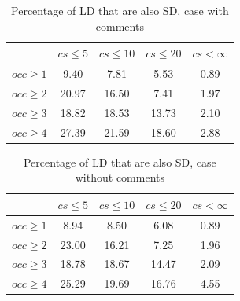 \documentclass[conference]{IEEEtran}
\begin{document}
\begin{table}[!h]
\renewcommand{\arraystretch}{1.25}
\caption{Percentage of LD that are also SD, case with comments}
\label{tab:percLD:comm}
\centering

\begin{tabular}{|c|c|c|c|c|}
\hline
	      &	$cs\leq 5$	&	$cs\leq 10$	&	$cs\leq 20$	&	$cs< \infty$	\\
\hline
$occ\geq 1$	&	9.40	&	7.81	&	5.53	&	0.89	\\
$occ\geq 2$	&	20.97	&	16.50	&	7.41	&	1.97	\\
$occ\geq 3$&	18.82	&	18.53	&	13.73	&	2.10	\\
$occ\geq 4$&	27.39	&	21.59	&	18.60	&	2.88	\\

\hline
\end{tabular}
\end{table}


\begin{table}[!h]
\renewcommand{\arraystretch}{1.25}
\caption{Percentage of LD that are also SD, case without comments}
\label{tab:percLD:nocomm}
\centering
\begin{tabular}{|c|c|c|c|c|}
\hline
	      &	$cs\leq 5$	&	$cs\leq 10$	&	$cs\leq 20$	&	$cs< \infty$	\\
\hline
$occ\geq 1$	&	8.94	&	8.50	&	6.08	&	0.89	\\
$occ\geq 2$	&	23.00	&	16.21	&	7.25	&	1.96	\\
$occ\geq 3$	&	18.78	&	18.67	&	14.47	&	2.09	\\
$occ\geq 4$	&	25.29	&	19.69	&	16.76	&	4.55	\\

\hline
\end{tabular}
\end{table}
\end{document}
